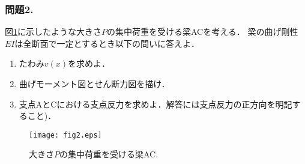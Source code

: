\documentclass[10pt,a4j]{jarticle}
\begin{document}
\subsubsection*{問題2. }
図\ref{fig:fig2}に示したような大きさ$P$の集中荷重を受ける梁ACを考える．
梁の曲げ剛性$EI$は全断面で一定とするとき以下の問いに答えよ．
\begin{enumerate}
\item
	たわみ$v(x)$を求めよ．		
\item
	曲げモーメント図とせん断力図を描け．
\item
	支点AとCにおける支点反力を求めよ．解答には支点反力の正方向を明記すること)．
\end{enumerate}
\begin{figure}[h]
	\begin{center}
	\texttt{[image: fig2.eps]} 
	\end{center}
	\vspace{-5mm}
	\caption{大きさ$P$の集中荷重を受ける梁AC.}
	\label{fig:fig2}
\end{figure}
\end{document}
